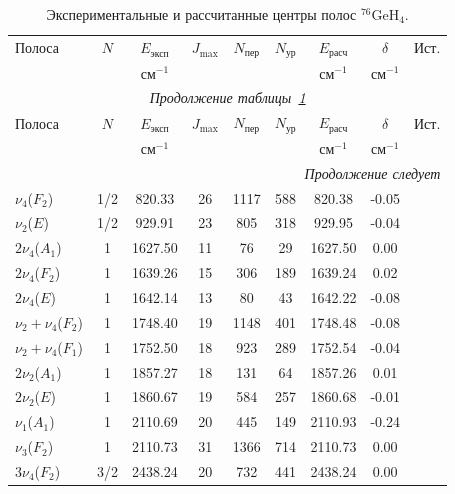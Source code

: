 \begingroup
\scriptsize
\setlength{\tabcolsep}{3pt}
\begin{longtable}{lcccccccc}
\caption{Экспериментальные и рассчитанные центры полос ${}^{76}$GeH$_4$.}\label{tab:ge_band_centers_76}\\
\toprule
Полоса & $N$ & $E_{\textrm{эксп}}$ & $J_{\max}$ & $N_{\textrm{пер}}$ & $N_{\textrm{ур}}$ & $E_{\textrm{расч}}$ & $\delta$ & Ист. \\
 & & \multicolumn{1}{c}{см$^{-1}$} & & & & \multicolumn{1}{c}{см$^{-1}$} & \multicolumn{1}{c}{см$^{-1}$} & \\
\midrule
\endfirsthead
\multicolumn{9}{c}{\small\slshape Продолжение таблицы~\ref{tab:ge_band_centers_76}}\\
\toprule
Полоса & $N$ & $E_{\textrm{эксп}}$ & $J_{\max}$ & $N_{\textrm{пер}}$ & $N_{\textrm{ур}}$ & $E_{\textrm{расч}}$ & $\delta$ & Ист. \\
 & & \multicolumn{1}{c}{см$^{-1}$} & & & & \multicolumn{1}{c}{см$^{-1}$} & \multicolumn{1}{c}{см$^{-1}$} & \\
\midrule
\endhead
\midrule
\multicolumn{9}{r}{\small\slshape Продолжение следует}\\
\endfoot
\bottomrule
\endlastfoot
$\nu_4$($F_2$) & 1/2 & 820.33 & 26 & 1117 & 588 & 820.38 & -0.05 & \cite{871} \\
$\nu_2$($E$) & 1/2 & 929.91 & 23 & 805 & 318 & 929.95 & -0.04 & \cite{871} \\
$2\nu_4$($A_1$) & 1 & 1627.50 & 11 & 76 & 29 & 1627.50 & 0.00 & \cite{872} \\
$2\nu_4$($F_2$) & 1 & 1639.26 & 15 & 306 & 189 & 1639.24 & 0.02 & \cite{872} \\
$2\nu_4$($E$) & 1 & 1642.14 & 13 & 80 & 43 & 1642.22 & -0.08 & \cite{872} \\
$\nu_2+\nu_4$($F_2$) & 1 & 1748.40 & 19 & 1148 & 401 & 1748.48 & -0.08 & \cite{872} \\
$\nu_2+\nu_4$($F_1$) & 1 & 1752.50 & 18 & 923 & 289 & 1752.54 & -0.04 & \cite{872} \\
$2\nu_2$($A_1$) & 1 & 1857.27 & 18 & 131 & 64 & 1857.26 & 0.01 & \cite{872} \\
$2\nu_2$($E$) & 1 & 1860.67 & 19 & 584 & 257 & 1860.68 & -0.01 & \cite{872} \\
$\nu_1$($A_1$) & 1 & 2110.69 & 20 & 445 & 149 & 2110.93 & -0.24 & \cite{873} \\
$\nu_3$($F_2$) & 1 & 2110.73 & 31 & 1366 & 714 & 2110.73 & 0.00 & \cite{873} \\
$3\nu_4$($F_2$) & 3/2 & 2438.24 & 20 & 732 & 441 & 2438.24 & 0.00 & \cite{874} \\

\end{longtable}
